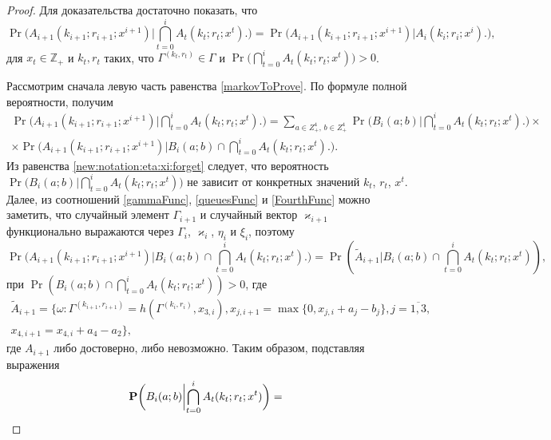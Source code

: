 \documentclass[a4paper,12pt,russian]{extarticle}
\begin{document}
\begin{proof}
Для доказательства достаточно показать, что 
\begin{equation}
\Pr \biggl( A_{i+1}(k_{i+1};r_{i+1};x^{i+1}) \biggl|\bigcap_{t=0}^{i} A_t(k_t;r_t;x^{t})\biggr.\biggr) = \Pr \biggl( A_{i+1}(k_{i+1};r_{i+1};x^{i+1}) \biggl|A_i(k_i;r_i;x^{i})\biggr.\biggr),
\label{markovToProve}
\end{equation}
для $x_t \in {\mathbb Z}_+$ и $k_t,r_t$ таких, что $\Gamma^{(k_t,r_t)}\in \Gamma$ и $\Pr \biggl( \bigcap\limits_{t=0}^{i} A_t(k_t;r_t;x^{t})\biggr)>0 $.

Рассмотрим сначала левую часть равенства \eqref{markovToProve}. По формуле полной вероятности, получим
\begin{multline}
\Pr \biggl( A_{i+1}(k_{i+1};r_{i+1};x^{i+1}) \biggl|\bigcap_{t=0}^{i} A_t(k_t;r_t;x^{t})\biggr.\biggr) 
= \sum_{a\in Z^4_+,\, b\in Z^4_+}\Pr \biggl( B_i(a;b) \biggl|\bigcap_{t=0}^{i} A_t(k_t;r_t;x^{t})\biggr.\biggr)\times\\
\times \Pr \biggl( A_{i+1}(k_{i+1};r_{i+1};x^{i+1}) \biggl|B_i(a;b) \cap \bigcap_{t=0}^{i} A_t(k_t;r_t;x^{t})\biggr.\biggr).
\label{markovProof}
\end{multline}
Из равенства \eqref{new:notation:eta:xi:forget} следует, что вероятность  $\Pr \biggl( B_i(a;b) \biggl|\bigcap\limits_{t=0}^{i} A_t(k_t;r_t;x^{t})\biggr)$ не зависит от конкретных значений $k_t$, $r_t$, $x^{t}$.
Далее, из соотношений \eqref{gammaFunc}, \eqref{queuesFunc} и \eqref{FourthFunc} можно заметить, что случайный элемент $\Gamma_{i+1}$ и случайный вектор $\varkappa_{i+1}$ функционально выражаются через $\Gamma_i$, $\varkappa_i$, $\eta_i$ и $\xi_i$, поэтому 
$$\Pr \biggl( A_{i+1}(k_{i+1};r_{i+1};x^{i+1}) \biggl|B_i(a;b) \cap \bigcap_{t=0}^{i} A_t(k_t;r_t;x^{t})\biggr.\biggr) = \Pr ( \tilde{A}_{i+1} |B_i(a;b) \cap \bigcap_{t=0}^{i} A_t(k_t;r_t;x^{t})) ,$$
при $\Pr (B_i(a;b) \cap \bigcap_{t=0}^{i} A_t(k_t;r_t;x^{t}))>0$, где 
\begin{multline*}
\tilde{A}_{i+1} = \{\omega\colon\Gamma^{(k_{i+1},r_{i+1})}=h(\Gamma^{(k_i,r_i)},x_{3,i}), x_{j,i+1}=\max\{0,x_{j,i}+a_{j}-b_{j}\}, j=\overline{1,3},\\ x_{4,i+1}=x_{4,i}+a_{4}-a_2\},
\end{multline*}
где $A_{i+1}$ либо достоверно, либо невозможно.
Таким образом, подставляя выражения
\begin{equation*}
\Pr \biggl( B_i(a;b) \biggl|\bigcap_{t=0}^{i} A_t(k_t;r_t;x^{t})\biggr.\biggr) = \\

\end{equation*}
\end{proof}
\end{document}
